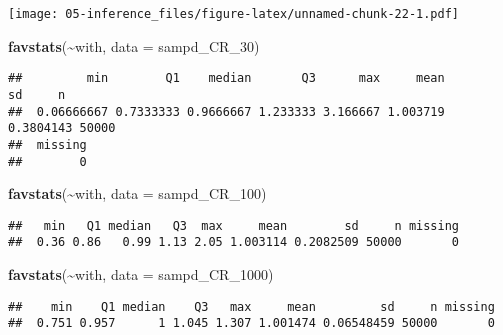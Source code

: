 \documentclass[
]{book}
\newenvironment{Shaded}{\begin{snugshade}}{\end{snugshade}}
\newcommand{\AttributeTok}[1]{\textcolor[rgb]{0.13,0.29,0.53}{#1}}
\newcommand{\FunctionTok}[1]{\textcolor[rgb]{0.13,0.29,0.53}{\textbf{#1}}}
\newcommand{\NormalTok}[1]{#1}
\newcommand{\SpecialCharTok}[1]{\textcolor[rgb]{0.81,0.36,0.00}{\textbf{#1}}}
\begin{document}
\texttt{[image: 05-inference\_files/figure-latex/unnamed-chunk-22-1.pdf]}

\begin{Shaded}
\begin{Highlighting}[]
\FunctionTok{favstats}\NormalTok{(}\SpecialCharTok{\textasciitilde{}}\NormalTok{with, }\AttributeTok{data =}\NormalTok{ sampd\_CR\_30)}
\end{Highlighting}
\end{Shaded}

\begin{verbatim}
##         min        Q1    median       Q3      max     mean        sd     n
##  0.06666667 0.7333333 0.9666667 1.233333 3.166667 1.003719 0.3804143 50000
##  missing
##        0
\end{verbatim}

\begin{Shaded}
\begin{Highlighting}[]
\FunctionTok{favstats}\NormalTok{(}\SpecialCharTok{\textasciitilde{}}\NormalTok{with, }\AttributeTok{data =}\NormalTok{ sampd\_CR\_100)}
\end{Highlighting}
\end{Shaded}

\begin{verbatim}
##   min   Q1 median   Q3  max     mean        sd     n missing
##  0.36 0.86   0.99 1.13 2.05 1.003114 0.2082509 50000       0
\end{verbatim}

\begin{Shaded}
\begin{Highlighting}[]
\FunctionTok{favstats}\NormalTok{(}\SpecialCharTok{\textasciitilde{}}\NormalTok{with, }\AttributeTok{data =}\NormalTok{ sampd\_CR\_1000)}
\end{Highlighting}
\end{Shaded}

\begin{verbatim}
##    min    Q1 median    Q3   max     mean         sd     n missing
##  0.751 0.957      1 1.045 1.307 1.001474 0.06548459 50000       0
\end{verbatim}

\begin{Shaded}
\end{Shaded}
\end{document}

